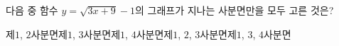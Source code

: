 다음 중 함수 $y=\sqrt{3x+9}-1$의 그래프가 지나는 사분면만을 모두 고른 것은?
\begin{choicesii}{제$1$, $2$사분면}{제$1$, $3$사분면}{제$1$, $4$사분면}{제$1$, $2$, $3$사분면}{제$1$, $3$, $4$사분면}\end{choicesii}
